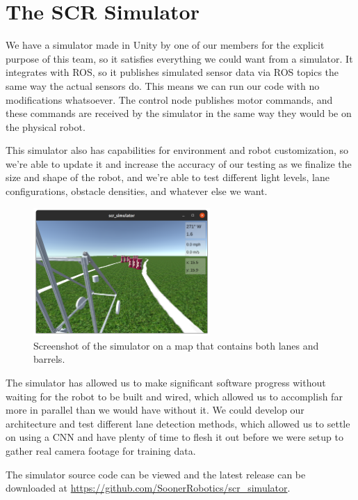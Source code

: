 \section{The SCR Simulator} \label{sec:sim}

We have a simulator made in Unity by one of our members for the explicit purpose of this team, so it satisfies everything we could want from a simulator. It integrates with ROS, so it publishes simulated sensor data via ROS topics the same way the actual sensors do. This means we can run our code with no modifications whatsoever. The control node publishes motor commands, and these commands are received by the simulator in the same way they would be on the physical robot.

This simulator also has capabilities for environment and robot customization, so we're able to update it and increase the accuracy of our testing as we finalize the size and shape of the robot, and we're able to test different light levels, lane configurations, obstacle densities, and whatever else we want.

\begin{figure}[h]
    \centering
    \includegraphics[width=0.6\textwidth]{images/software/sim_screenshot.png}
    \caption{Screenshot of the simulator on a map that contains both lanes and barrels.}
\end{figure}

The simulator has allowed us to make significant software progress without waiting for the robot to be built and wired, which allowed us to accomplish far more in parallel than we would have without it. We could develop our architecture and test different lane detection methods, which allowed us to settle on using a CNN and have plenty of time to flesh it out before we were setup to gather real camera footage for training data.

The simulator source code can be viewed and the latest release can be downloaded at \url{https://github.com/SoonerRobotics/scr_simulator}.